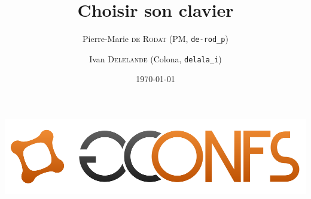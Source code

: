 \documentclass{beamer}
\title{Choisir son clavier}
\author{
  Pierre-Marie \textsc{de Rodat} (PM, \texttt{de-rod\_p})\\
  \and Ivan \textsc{Delelande} (Colona, \texttt{delala\_i})
}
\date{\today}
\begin{document}
\begin{frame}
    \begin{center}
        \includegraphics[scale=0.35]{images/gconfs.png}
    \end{center}
    \maketitle
\end{frame}



\AtBeginSection{
  \begin{frame}
    \tableofcontents[currentsection]
  \end{frame}
}





\end{document}
